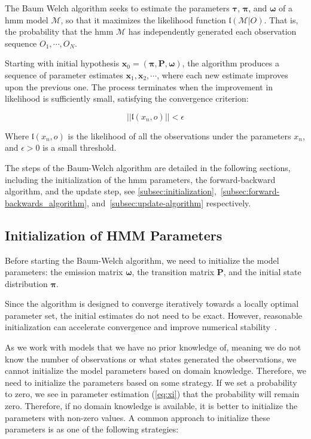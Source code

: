 The Baum Welch algorithm seeks to estimate the parameters $\pmb{\tau}$, $\pmb{\pi}$, and $\pmb{\omega}$ of a \gls{hmm} model $\mathcal{M}$, so that it maximizes the likelihood function $\mathfrak{l}(\mathcal{M} | O)$.
That is, the probability that the \gls{hmm} $\mathcal{M}$ has independently generated each observation sequence $O_1, \cdots, O_N$.

Starting with initial hypothesis $\textbf{x}_0 = (\pmb{\pi}, \pmb{P}, \pmb{\omega})$, the algorithm produces a sequence of parameter estimates $\textbf{x}_1, \textbf{x}_2, \cdots$, where each new estimate improves upon the previous one.
The process terminates when the improvement in likelihood is sufficiently small, satisfying the convergence criterion:

\[
    ||\mathfrak{l}(x_n, o)|| < \epsilon
\]

Where $\mathfrak{l}(x_n, o)$ is the likelihood of all the observations under the parameters $x_n$, and $\epsilon > 0$ is a small threshold.

The steps of the Baum-Welch algorithm are detailed in the following sections, including the initialization of the \gls{hmm} parameters, the forward-backward algorithm, and the update step, see \autoref{subsec:initialization},~\ref{subsec:forward-backwards_algorithm}, and~\ref{subsec:update-algorithm} respectively.

\subsection{Initialization of HMM Parameters}\label{subsec:initialization}
Before starting the Baum-Welch algorithm, we need to initialize the model parameters: the emission matrix $\pmb{\omega}$, the transition matrix $\pmb{P}$, and the initial state distribution $\pmb{\pi}$.

Since the algorithm is designed to converge iteratively towards a locally optimal parameter set, the initial estimates do not need to be exact.
However, reasonable initialization can accelerate convergence and improve numerical stability~\cite{benyacoub2015initial}.

As we work with models that we have no prior knowledge of, meaning we do not know the number of observations or what states generated the observations, we cannot initialize the model parameters based on domain knowledge.
Therefore, we need to initialize the parameters based on some strategy.
If we set a probability to zero, we see in parameter estimation (\autoref{eq:xi}) that the probability will remain zero. 
Therefore, if no domain knowledge is available, it is better to initialize the parameters with non-zero values.
A common approach to initialize these parameters is as one of the following strategies:

